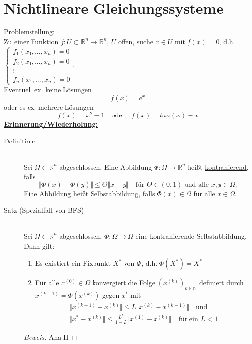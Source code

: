 \documentclass[12pt]{article}
\theoremstyle{break}
\begin{document}
\section{Nichtlineare Gleichungssysteme}
\underline{Problemstellung:}\\
Zu einer Funktion $f: U \subset \mathbb{R}^n \rightarrow \mathbb{R}^n$, $U$ offen, suche $x \in U$ mit $f(x) = 0$, d.h. $\left\{ \begin{matrix} f_1(x_1, ..., x_n) = 0 \\ f_2(x_1, ..., x_n) = 0 \\ \vdots \\ f_n(x_1, ...,x_n) = 0 \end{matrix} \right.$.\\
Eventuell ex. keine Lösungen
$$f(x) = e^x$$
oder es ex. mehrere Lösungen
$$f(x) = x^2-1 \quad \text{oder} \quad f(x) = tan(x) - x$$
%
\underline{\textbf{Erinnerung/Wiederholung:}}
%
\begin{description}
  \item[Definition:] \leavevmode \\
  Sei $\Omega \subset \mathbb{R}^n$ abgeschlossen. Eine Abbildung $\Phi: \Omega \rightarrow \mathbb{R}^n$ heißt \underline{kontrahierend}, falls
  $$ \Vert \Phi(x) - \Phi(y) \Vert \leq \Theta \Vert x-y \Vert \quad \text{für } \Theta \in (0,1) \text{ und alle } x, y \in \Omega.$$
  Eine Abbildung heißt \underline{Selbstabbildung}, falls $\Phi(x) \in \Omega$ für alle $x \in \Omega$.
  
  \item[Satz (Spezialfall von BFS)] \leavevmode \\
  Sei $\Omega \subset \mathbb{R}^n$ abgeschlossen, $\Phi: \Omega \rightarrow \Omega$ eine kontrahierende Selbstabbildung. Dann gilt:
  \renewcommand{\labelenumi}{\roman{enumi})}
  \begin{enumerate}
    \item Es existiert ein Fixpunkt $X^*$ von $\Phi$, d.h. $\Phi(X^*) = X^*$
    \item Für alle $x^{(0)} \in \Omega$ konvergiert die Folge $(x^{(k)})_{k \in \mathbb{N}}$ definiert durch $x^{(k+1)} = \Phi(x^{(k)})$ gegen $x^*$ mit 
    \begin{align*}
      &\Vert x^{(k+1)} - x^{(k)} \Vert \leq L \Vert x^{(k)} - x^{(k-1)} \Vert \quad \text{und} &\\
      &\Vert x^* - x^{(k)} \Vert \leq \frac{L^k}{1-L} \Vert x^{(1)} - x^{(k)} \Vert \quad \text{für ein } L < 1
    \end{align*}
  \end{enumerate}
  \begin{proof}[Beweis] 
  Ana II
  \end{proof}
\end{description}

\end{document}
